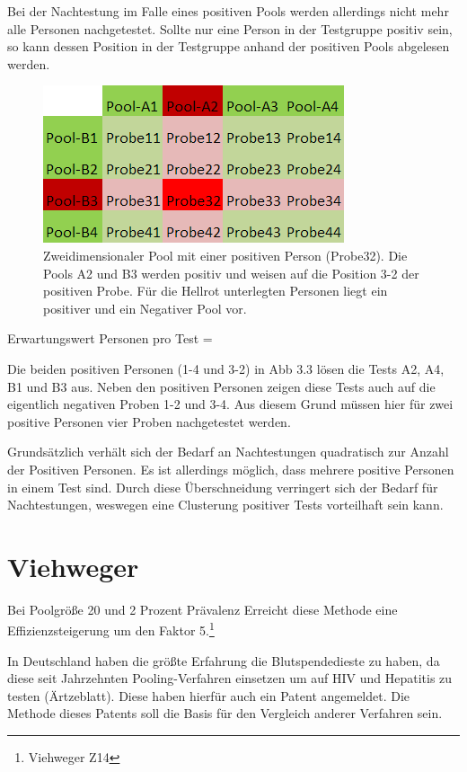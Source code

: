 Bei der Nachtestung im Falle eines positiven Pools werden allerdings nicht mehr alle Personen nachgetestet.
Sollte nur eine Person in der Testgruppe positiv sein, so kann dessen Position in der Testgruppe anhand der positiven Pools abgelesen werden.
\begin{figure}[h]
	\centering
	\includegraphics[height=.25\textwidth]{img/2d_Pool_1Positiv}
	\caption{Zweidimensionaler Pool mit einer positiven Person (Probe32). Die Pools A2 und B3 werden positiv und weisen auf die Position 3-2 der positiven Probe. Für die Hellrot unterlegten Personen liegt ein positiver und ein Negativer Pool vor.\footnotemark}
\end{figure}

Erwartungswert Personen pro Test =

Die beiden positiven Personen (1-4 und 3-2) in Abb 3.3 lösen die Tests A2, A4, B1 und B3 aus.
Neben den positiven Personen zeigen diese Tests auch auf die eigentlich negativen Proben 1-2 und 3-4.
Aus diesem Grund müssen hier für zwei positive Personen vier Proben nachgetestet werden.

Grundsätzlich verhält sich der Bedarf an Nachtestungen quadratisch zur Anzahl der Positiven Personen.
Es ist allerdings möglich, dass mehrere positive Personen in einem Test sind.
Durch diese Überschneidung verringert sich der Bedarf für Nachtestungen, weswegen eine Clusterung positiver Tests vorteilhaft sein kann.

\cleardoublepage
\section{Viehweger}
Bei Poolgröße 20 und 2 Prozent Prävalenz Erreicht diese Methode eine Effizienzsteigerung um den Faktor 5.\footnote{Viehweger Z14}


In Deutschland haben die größte Erfahrung die Blutspendedieste zu haben, da diese seit Jahrzehnten Pooling-Verfahren einsetzen um auf HIV und Hepatitis zu testen (Ärtzeblatt). Diese haben hierfür auch ein Patent angemeldet. Die Methode dieses Patents soll die Basis für den Vergleich anderer Verfahren sein.

